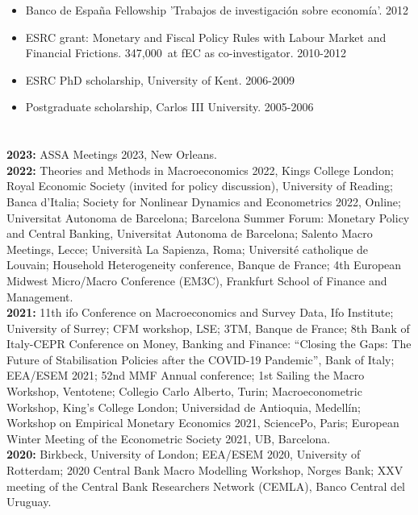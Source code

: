 \documentclass[margin, 11pt]{res} %
\begin{document}
\begin{resume}
\begin{itemize}
\item Banco de Espa\~{n}a Fellowship 'Trabajos de investigaci\'{o}n sobre econom\'{i}a'. \hfill 2012
\item ESRC grant: Monetary and Fiscal Policy Rules with Labour Market and Financial Frictions. 347,000\textsterling$\,$  at fEC  as co-investigator. \hfill 2010-2012 
\item ESRC PhD scholarship, University of Kent. \hfill 2006-2009
\item Postgraduate scholarship, Carlos III University. \hfill 2005-2006
\end{itemize}


\section{}
\textbf{2023:} {ASSA Meetings 2023, New Orleans.}
\\
\textbf{2022:} {Theories and Methods in Macroeconomics 2022, Kings College London; Royal Economic Society (invited for policy discussion), University of Reading; Banca d'Italia; Society for Nonlinear Dynamics and Econometrics 2022, Online; Universitat Autonoma de Barcelona; Barcelona Summer Forum: Monetary Policy and Central Banking, Universitat Autonoma de Barcelona; Salento Macro Meetings, Lecce; Universit\`{a} La Sapienza, Roma; Universit\'{e} catholique de Louvain; Household Heterogeneity conference, Banque de France; 4th European Midwest Micro/Macro Conference (EM3C), Frankfurt School of Finance and Management.}
\\
\textbf{2021:} {11th ifo Conference on Macroeconomics and Survey Data, Ifo Institute; University of Surrey; CFM workshop, LSE; 3TM, Banque de France; 8th Bank of Italy-CEPR Conference on Money, Banking and Finance: “Closing the Gaps: The Future of Stabilisation Policies after the COVID-19 Pandemic”, Bank of Italy; EEA/ESEM 2021; 52nd MMF Annual conference; 1st Sailing the Macro Workshop, Ventotene; Collegio Carlo Alberto, Turin; Macroeconometric Workshop, King's College London; Universidad de Antioquia, Medell\'{i}n; Workshop on Empirical Monetary Economics 2021, SciencePo, Paris; European Winter Meeting of the Econometric Society 2021, UB, Barcelona.}
\\
\textbf{2020:} {Birkbeck, University of London; EEA/ESEM 2020, University of Rotterdam; 2020 Central Bank Macro Modelling Workshop, Norges Bank; XXV meeting of the Central Bank Researchers Network (CEMLA), Banco Central del Uruguay.}
\\

\end{resume}
\end{document}
